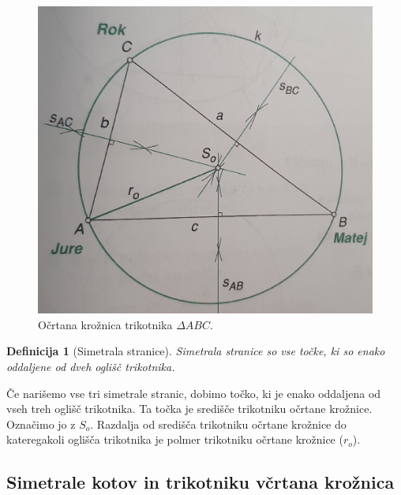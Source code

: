 \documentclass{article}
\newtheorem{definicija}{Definicija}[subsection]
\begin{document}
\begin{figure}[h]
    \includegraphics[width=\linewidth]{ocrtanaKroznica.png}
    \centering
    \caption{Očrtana krožnica trikotnika $\Delta ABC$.}
\end{figure}

\begin{definicija}[Simetrala stranice]
    Simetrala stranice so vse točke, ki so enako oddaljene od dveh oglišč trikotnika.
\end{definicija}

Če narišemo vse tri simetrale stranic, dobimo točko, ki je enako oddaljena od vseh treh oglišč trikotnika. Ta točka je središče trikotniku očrtane krožnice. Označimo jo z $S_o$. Razdalja od središča trikotniku očrtane krožnice do kateregakoli oglišča trikotnika je polmer trikotniku očrtane krožnice ($r_o$).


\pagebreak
\subsection{ Simetrale kotov in trikotniku včrtana krožnica }
\end{document}

